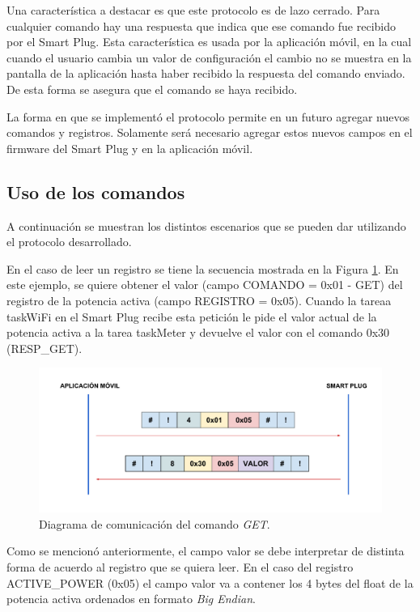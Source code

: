 Una característica a destacar es que este protocolo es de lazo cerrado. Para cualquier comando hay una respuesta que indica que ese comando fue recibido por el Smart Plug. Esta característica es usada por la aplicación móvil, en la cual cuando el usuario cambia un valor de configuración el cambio no se muestra en la pantalla de la aplicación hasta haber recibido la respuesta del comando enviado. De esta forma se asegura que el comando se haya recibido.

La forma en que se implementó el protocolo permite en un futuro agregar nuevos comandos y registros. Solamente será necesario agregar estos nuevos campos en el firmware del Smart Plug y en la aplicación móvil.


\subsection{Uso de los comandos}

A continuación se muestran los distintos escenarios que se pueden dar utilizando el protocolo desarrollado.

En el caso de leer un registro se tiene la secuencia mostrada en la Figura \ref{fig:comunicacion_get}. En este ejemplo, se quiere obtener el valor (campo COMANDO = 0x01 - GET) del registro de la potencia activa (campo REGISTRO = 0x05). Cuando la tareaa taskWiFi en el Smart Plug recibe esta petición le pide el valor actual de la potencia activa a la tarea taskMeter y devuelve el valor con el comando 0x30 (RESP\_GET).

\begin{figure}[h]
	\centering
	\includegraphics[width=14cm]{./Figures/3_2_5_comunicacion_GET.pdf}
	\caption{Diagrama de comunicación del comando \textit{GET}.}
	\label{fig:comunicacion_get}
\end{figure}

Como se mencionó anteriormente, el campo valor se debe interpretar de distinta forma de acuerdo al registro que se quiera leer. En el caso del registro ACTIVE\_POWER (0x05) el campo valor va a contener los 4 bytes del float de la potencia activa ordenados en formato \textit{Big Endian}.

